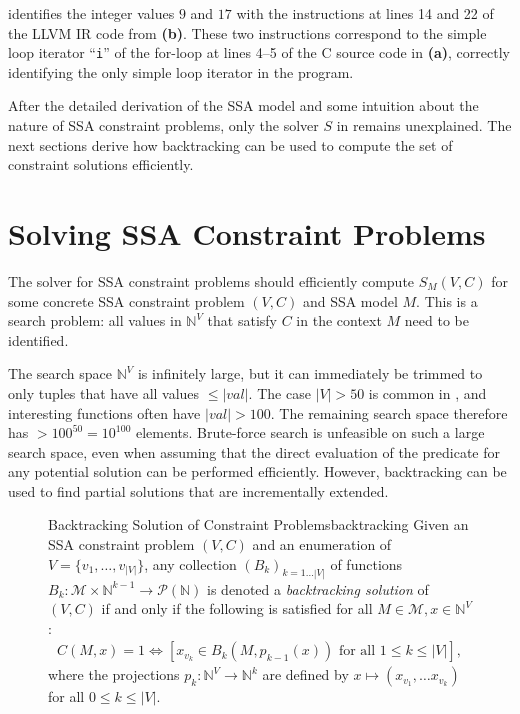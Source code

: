      identifies the integer values $9$ and $17$ with the
    instructions at lines 14 and 22 of the LLVM IR code from
     {\bf(b)}.
    These two instructions correspond to the simple loop iterator ``\texttt{i}''
    of the for-loop at lines 4--5 of the C source code in
     {\bf(a)}, correctly identifying the only simple loop
    iterator in the program.

    After the detailed derivation of the SSA model and some intuition about the
    nature of SSA constraint problems, only the solver $S$ in
     remains unexplained.
    The next sections derive how backtracking can be used to
    compute the set of constraint solutions efficiently.

\section{Solving SSA Constraint Problems}
\label{sec:constraintsolving}

    The solver for SSA constraint problems should efficiently compute $S_M(V,C)$
    for some concrete SSA constraint problem $(V,C)$ and SSA model $M$.
    This is a search problem:
    all values in $\mathbb N^V$ that satisfy $C$ in the context $M$ need to be
    identified.

    The search space $\mathbb N^V$ is infinitely large, but it can immediately
    be trimmed to only tuples that have all values $\leq|val|$.
    The case \mbox{$|V|>50$} is common in
    , and interesting
    functions often have \mbox{$|val|>100$}.
    The remaining search space therefore has $>100^{50}=10^{100}$ elements.
    Brute-force search is unfeasible on such a large search space, even when
    assuming that the direct evaluation of the predicate for any potential
    solution can be performed efficiently.
    However, backtracking can be used to find partial solutions that are
    incrementally extended.

\begin{figure}[h]
    \begin{definition}{Backtracking Solution of Constraint Problems}{backtracking}
        Given an SSA constraint problem $(V,C)$ and an enumeration of
        $V=\{v_1,\dots,v_{|V|}\}$, any collection $(B_k)_{k=1\dots |V|}$
        of functions
        $B_k:\mathcal M\times \mathbb N^{k-1}\rightarrow\mathcal P(\mathbb N)$
        is denoted a {\em backtracking solution} of $(V,C)$ if and only if the
        following is satisfied for all $M\in\mathcal M,x\in\mathbb N^V$:
        \begin{align}
            C(M,x)=1\iff\left[x_{v_k}\in B_k(M,p_{k-1}(x))\text{ for all }1\leq k\leq |V|\right],
        \end{align}
        where the projections $p_k\colon\mathbb N^V\rightarrow\mathbb N^k$ are
        defined by $x\mapsto(x_{v_1},\dots x_{v_k})$ for all $0\leq k\leq |V|$.
    \end{definition}
\end{figure}

